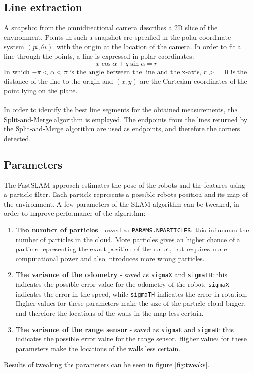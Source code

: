 \documentclass[12pt]{article}
\begin{document}
\subsection{Line extraction}
A snapshot from the omnidirectional camera describes a 2D slice of the environment. Points in such a snapshot are specified in the polar coordinate system $(pi, {\theta}i)$, with the origin at the location of the camera. In order to fit a line through the points, a line is expressed in polar coordinates:
\begin{equation}
	x\cos{\alpha} + y\sin{\alpha} = r
\end{equation}
In which $-\pi < \alpha < \pi$ is the angle between the line and the x-axis, $r >= 0$ is the distance of the line to the origin and $(x, y)$ are the Cartesian coordinates of the point lying on the plane. \\ \\
In order to identify the best line segments for the obtained measurements, the Split-and-Merge algorithm is employed. The endpoints from the lines returned by the Split-and-Merge algorithm are used as endpoints, and therefore the corners detected.

\subsection{Parameters}
The FastSLAM approach estimates the pose of the robots and the features using a particle filter. Each particle represents a possible robots position and its map of the environment. A few parameters of the SLAM algorithm can be tweaked, in order to improve performance of the algorithm:
\begin{enumerate}
\item \textbf{The number of particles} - saved as \verb|PARAMS.NPARTICLES|: this influences the number of particles in the cloud. More particles gives an higher chance of a particle representing the exact position of the robot, but requires more computational power and also introduces more wrong particles.
\item \textbf{The variance of the odometry} - saved as \verb|sigmaX| and \verb|sigmaTH|: this indicates the possible error value for the odometry of the robot. \verb|sigmaX| indicates the error in the speed, while \verb|sigmaTH| indicates the error in rotation. Higher values for these parameters make the size of the particle cloud bigger, and therefore the locations of the walls in the map less certain.
\item \textbf{The variance of the range sensor} - saved as \verb|sigmaR| and \verb|sigmaB|: this indicates the possible error value for the range sensor. Higher values for these parameters make the locations of the walls less certain.
\end{enumerate}
Results of tweaking the parameters can be seen in figure \ref{fig:tweaks}.
\end{document}
